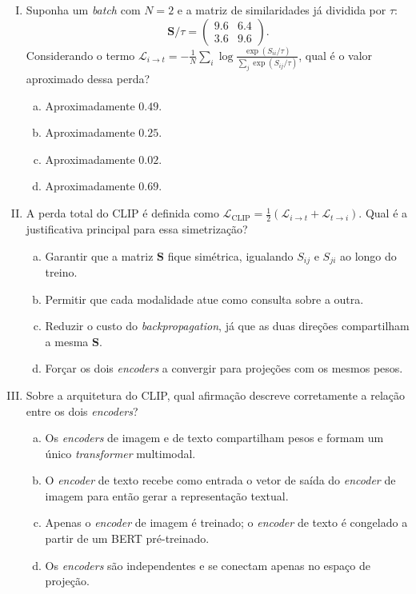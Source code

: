 \documentclass{dlproblemset}
\begin{document}
\begin{enumerate}[I)]
    \item {} Suponha um \textit{batch} com $N = 2$ e a matriz de similaridades já dividida por $\tau$:
    \[
        \mathbf{S}/\tau = \begin{pmatrix} 9.6 & 6.4 \\ 3.6 & 9.6 \end{pmatrix}.
    \]
    Considerando o termo $\mathcal{L}_{i \to t} = -\tfrac{1}{N}\sum_i \log\frac{\exp(S_{ii}/\tau)}{\sum_j \exp(S_{ij}/\tau)}$, qual é o valor aproximado dessa perda?
    \begin{enumerate}[(a)]
        \item Aproximadamente $0.49$.
        \item Aproximadamente $0.25$.
        \item Aproximadamente $0.02$.
        \item Aproximadamente $0.69$.
    \end{enumerate}

    \item A perda total do CLIP é definida como $\mathcal{L}_{\text{CLIP}} = \tfrac{1}{2}(\mathcal{L}_{i \to t} + \mathcal{L}_{t \to i})$. Qual é a justificativa principal para essa simetrização?
    \begin{enumerate}[(a)]
        \item Garantir que a matriz $\mathbf{S}$ fique simétrica, igualando $S_{ij}$ e $S_{ji}$ ao longo do treino.
        \item Permitir que cada modalidade atue como consulta sobre a outra.
        \item Reduzir o custo do \textit{backpropagation}, já que as duas direções compartilham a mesma $\mathbf{S}$.
        \item Forçar os dois \textit{encoders} a convergir para projeções com os mesmos pesos.
    \end{enumerate}

    \item Sobre a arquitetura do CLIP, qual afirmação descreve corretamente a relação entre os dois \textit{encoders}?
    \begin{enumerate}[(a)]
        \item Os \textit{encoders} de imagem e de texto compartilham pesos e formam um único \textit{transformer} multimodal.
        \item O \textit{encoder} de texto recebe como entrada o vetor de saída do \textit{encoder} de imagem para então gerar a representação textual.
        \item Apenas o \textit{encoder} de imagem é treinado; o \textit{encoder} de texto é congelado a partir de um BERT pré-treinado.
        \item Os \textit{encoders} são independentes e se conectam apenas no espaço de projeção.
    \end{enumerate}


\end{enumerate}
\end{document}
